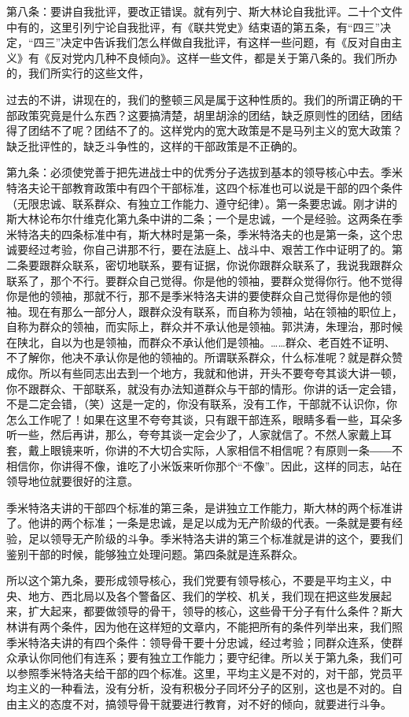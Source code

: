 第八条：要讲自我批评，要改正错误。就有列宁、斯大林论自我批评。二十个文件中有的，这里引列宁论自我批评，有《联共党史》结束语的第五条，有“四三”决定，“四三”决定中告诉我们怎么样做自我批评，有这样一些问题，有《反对自由主义》有《反对党内几种不良倾向》。这样一些文件，都是关于第八条的。我们所办的，我们所实行的这些文件，

过去的不讲，讲现在的，我们的整顿三风是属于这种性质的。我们的所谓正确的干部政策究竟是什么东西？这要搞清楚，胡里胡涂的团结，缺乏原则性的团结，团结得了团结不了呢？团结不了的。这样党内的宽大政策是不是马列主义的宽大政策？缺乏批评性的，缺乏斗争性的，这样的干部政策是不正确的。

第九条：必须使党善于把先进战士中的优秀分子选拔到基本的领导核心中去。季米特洛夫论干部教育政策中有四个干部标准，这四个标准也可以说是干部的四个条件（无限忠诚、联系群众、有独立工作能力、遵守纪律）。第一条要忠诚。刚才讲的斯大林论布尔什维克化第九条中讲的二条；一个是忠诚，一个是经验。这两条在季米特洛夫的四条标准中有，斯大林时是第一条，季米特洛夫的也是第一条，这个忠诚要经过考验，你自己讲那不行，要在法庭上、战斗中、艰苦工作中证明了的。第二条要跟群众联系，密切地联系，要有证据，你说你跟群众联系了，我说我跟群众联系了，那个不行。要群众自己觉得。你是他的领袖，要群众觉得你行。他不觉得你是他的领袖，那就不行，那不是季米特洛夫讲的要使群众自己觉得你是他的领袖。现在有那么一部分人，跟群众没有联系，而自称为领袖，站在领袖的职位上，自称为群众的领袖，而实际上，群众并不承认他是领袖。郭洪涛，朱理治，那时候在陕北，自以为也是领袖，而群众不承认他们是领袖。……群众、老百姓不证明、不了解你，他决不承认你是他的领袖的。所谓联系群众，什么标准呢？就是群众赞成你。所以有些同志出去到一个地方，我就和他讲，开头不要夸夸其谈大讲一顿，你不跟群众、干部联系，就没有办法知道群众与干部的情形。你讲的话一定会错，不是二定会错，（笑）这是一定的，你没有联系，没有工作，干部就不认识你，你怎么工作呢了！如果在这里不夸夸其谈，只有跟干部连系，眼睛多看一些，耳朵多听一些，然后再讲，那么，夸夸其谈一定会少了，人家就信了。不然人家戴上耳套，戴上眼镜来听，你讲的不大切合实际，人家相信不相信呢？有原则一条――不相信你，你讲得不像，谁吃了小米饭来听你那个“不像”。因此，这样的同志，站在领导地位就要很好的注意。

季米特洛夫讲的干部四个标准的第三条，是讲独立工作能力，斯大林的两个标准讲了。他讲的两个标准；一条是忠诚，是足以成为无产阶级的代表。一条就是要有经验，足以领导无产阶级的斗争。季米特洛夫讲的第三个标准就是讲的这个，要我们鉴别干部的时候，能够独立处理问题。第四条就是连系群众。

所以这个第九条，要形成领导核心，我们党要有领导核心，不要是平均主义，中央、地方、西北局以及各个警备区、我们的学校、机关，我们现在把这些发展起来，扩大起来，都要做领导的骨干，领导的核心，这些骨干分子有什么条件？斯大林讲有两个条件，因为他在这样短的文章内，不能把所有的条件列举出来，我们照季米特洛夫讲的有四个条件：领导骨干要十分忠诚，经过考验；同群众连系，使群众承认你同他们有连系；要有独立工作能力；要守纪律。所以关于第九条，我们可以参照季米特洛夫给干部的四个标准。这里，平均主义是不对的，对干部，党员平均主义的一种看法，没有分析，没有积极分子同坏分子的区别，这也是不对的。自由主义的态度不对，搞领导骨干就要进行教育，对不好的倾向，就要进行斗争。

